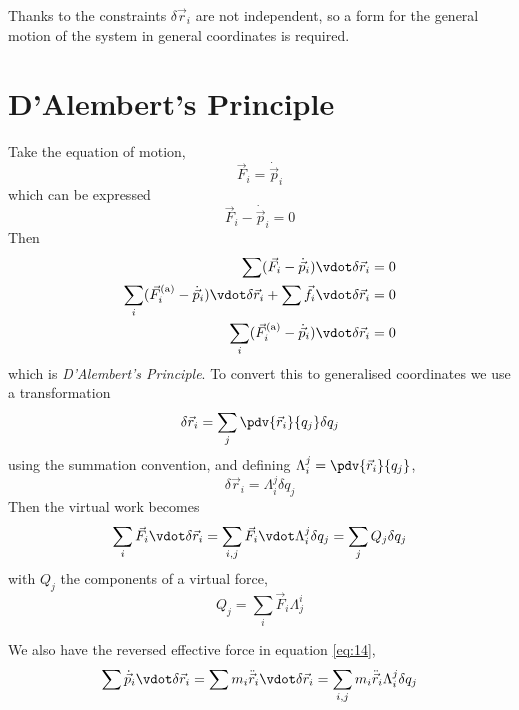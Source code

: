 Thanks to the constraints $\delta \vec{r}_i$ are not independent, so a
form for the general motion of the system in general coordinates is
required.

\section{D'Alembert's Principle}
\label{sec:dalemberts-principle}

Take the equation of motion, 
\[ \vec{F}_i = \dot{\vec{p}}_i \]
which can be expressed 
\[ \vec{F}_i - \dot{\vec{p}}_i = 0 \]
Then
\begin{subequations}
\begin{align}
  \label{eq:14}
  \sum (\vec{F}_i - \dot{\vec{p}}_i) \vdot \delta \vec{r}_i &=0 \\
\sum_i (\vec{F}_i^{\rm (a)} - \dot{\vec{p}}_i ) \vdot \delta \vec{r}_i + \sum \vec{f}_i \vdot \delta \vec{r}_i &= 0 \\
\sum_i (\vec{F}_i^{\rm (a)} - \dot{\vec{p}}_i ) \vdot \delta \vec{r}_i &= 0
\end{align}
\end{subequations}
which is \emph{D'Alembert's Principle}. To convert this to generalised
coordinates we use a transformation
\begin{equation}
  \label{eq:15}
  \delta \vec{r}_i = \sum_j \pdv{\vec{r}_i}{q_j} \delta q_j
\end{equation}
using the summation convention, and defining $\Lambda^j_i = \pdv{\vec{r}_i}{q_j}$,
\[ \delta \vec{r}_i = \Lambda^j_i \delta q_j \]
Then the virtual work becomes
\begin{equation}
  \label{eq:16}
  \sum_i \vec{F}_i  \vdot \delta \vec{r}_i = \sum_{i,j} \vec{F}_i \vdot \Lambda^j_i \delta q_j = \sum_j Q_j \delta q_j
\end{equation}
with $Q_j$ the components of a virtual force,
\[ Q_j = \sum_i \vec{F}_i \Lambda^i_j \]

We also have the reversed effective force in equation \eqref{eq:14},
\begin{equation}
  \label{eq:17}
  \sum \dot{\vec{p}}_i \vdot \delta \vec{r}_i = \sum m_i \ddot{\vec{r}}_i \vdot \delta \vec{r}_i = \sum_{i,j} m_i \ddot{\vec{r}}_i \Lambda^j_i \delta q_j 
\end{equation}

